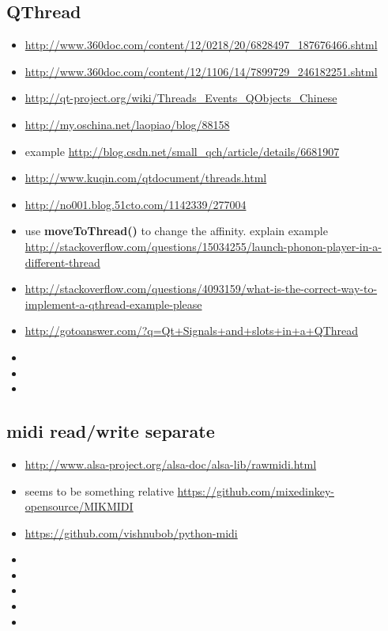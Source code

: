 \documentclass[9pt,b5paper]{article}
\begin{document}
\subsection{QThread}
\label{sec-18-22}
\begin{itemize}
\item \url{http://www.360doc.com/content/12/0218/20/6828497_187676466.shtml}
\item \url{http://www.360doc.com/content/12/1106/14/7899729_246182251.shtml}
\item \url{http://qt-project.org/wiki/Threads_Events_QObjects_Chinese}
\item \url{http://my.oschina.net/laopiao/blog/88158}
\item example \url{http://blog.csdn.net/small_qch/article/details/6681907}
\item \url{http://www.kuqin.com/qtdocument/threads.html}
\item \url{http://no001.blog.51cto.com/1142339/277004}
\item use \textbf{moveToThread()} to change the affinity. explain example \url{http://stackoverflow.com/questions/15034255/launch-phonon-player-in-a-different-thread}
\item \url{http://stackoverflow.com/questions/4093159/what-is-the-correct-way-to-implement-a-qthread-example-please}
\item \url{http://gotoanswer.com/?q=Qt+Signals+and+slots+in+a+QThread}
\item 
\item 
\item 
\end{itemize}
\subsection{midi read/write separate}
\label{sec-18-23}
\begin{itemize}
\item \url{http://www.alsa-project.org/alsa-doc/alsa-lib/rawmidi.html}
\item seems to be something relative \url{https://github.com/mixedinkey-opensource/MIKMIDI}
\item \url{https://github.com/vishnubob/python-midi}
\item 
\item 
\item 
\item 
\item 
\end{itemize}
\end{document}
